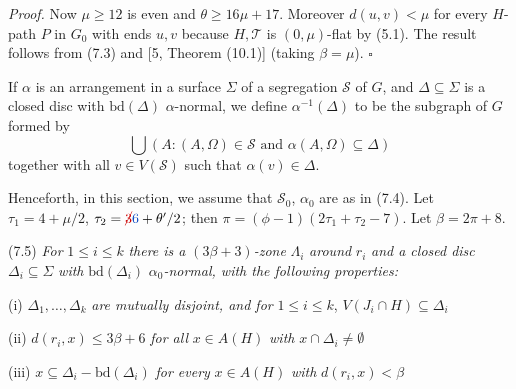 \textit{Proof.} Now $\mu \ge 12$ is even and $\theta \ge 16\mu + 17$. Moreover $d(u, v) < \mu$ for every $H$-path $P$ in $G_0$ with ends $u, v$ because $H, \mathcal{T}$ is $(0, \mu)$-flat by (5.1). The result follows from (7.3) and [5, Theorem (10.1)] (taking $\beta = \mu$). $\square$

If $\alpha$ is an arrangement in a surface $\Sigma$ of a segregation $\mathcal{S}$ of $G$, and $\Delta \subseteq \Sigma$ is a closed disc with $\text{bd}(\Delta)$ $\alpha$-normal, we define $\alpha^{-1}(\Delta)$ to be the subgraph of $G$ formed by
\begin{equation*}
\bigcup (A \colon (A, \Omega) \in \mathcal{S} \text{ and } \alpha(A, \Omega) \subseteq \Delta)
\end{equation*}
together with all $v \in V(\mathcal{S})$ such that $\alpha(v) \in \Delta$.

Henceforth, in this section, we assume that $\mathcal{S}_0$, $\alpha_0$ are as in (7.4). Let $\tau_1 = 4 + \mu/2$, $\tau_2 = \delm{3}\fix{6} + \theta'/2$; then $\pi = (\phi - 1)(2\tau_1 + \tau_2 - 7)$. Let $\beta = 2\pi + 8$.

\stmt
(7.5) \textit{For} $1 \le i \le k$ \textit{there is a} $(3\beta + 3)$\textit{-zone} $\Lambda_i$ \textit{around} $r_i$ \textit{and a closed disc} $\Delta_i \subseteq \Sigma$ \textit{with} $\text{bd}(\Delta_i)$ $\alpha_0$\textit{-normal, with the following properties:}

\hspace*{12pt}(i) $\Delta_1, \dots, \Delta_k$ \textit{are mutually disjoint, and for} $1 \le i \le k$, $V(J_i \cap H) \subseteq \Delta_i$

\hspace*{12pt}(ii) $d(r_i, x) \le 3\beta + 6$ \textit{for all} $x \in A(H)$ \textit{with} $x \cap \Delta_i \ne \emptyset$

\hspace*{12pt}(iii) $x \subseteq \Delta_i - \text{bd}(\Delta_i)$ \textit{for every} $x \in A(H)$ \textit{with} $d(r_i, x) < \beta$

